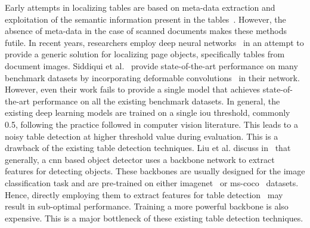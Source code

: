 \documentclass[a4paper,conference]{IEEEtran}
\begin{document}
Early attempts in localizing tables are based on meta-data extraction and exploitation of the semantic information present in the tables~\cite{Itonori1993TableSR,Kieninger1998TableSR,Tupaj96extractingtabular}. However, the absence of meta-data in  the case of scanned documents makes these methods futile. In recent years, researchers employ deep neural networks~\cite{gilani2017table,schreiber2017deepdesrt,siddiqui2018decnt,sun2019faster,vo2018ensemble,arif2018table,li2019tablebank,younas2019ffd,zhong2019publaynet,saha2019graphical,casado2019benefits} in an attempt to provide a  generic solution for localizing page objects, specifically tables from document images. Siddiqui et al.~\cite{siddiqui2018decnt} provide state-of-the-art performance on  many benchmark datasets by incorporating deformable convolutions~\cite{dai2017deformable} in their network. However, even their work fails to provide a single model that achieves state-of-the-art performance on all the existing benchmark datasets. In general, the existing deep learning models are trained on a single {\sc i}o{\sc u} threshold, commonly 0.5, following the practice followed in computer vision literature.  This leads to a noisy table detection at higher threshold value during evaluation. This is a drawback of the existing table detection techniques. Liu et al. discuss in~\cite{liu2019cbnet} that generally, a {\sc cnn} based object detector uses a backbone network to extract features for detecting objects. These backbones are usually designed for the image classification task and  are pre-trained on either {\sc i}mage{\sc n}et~\cite{deng2009imagenet} or {\sc ms-coco}~\cite{lin2014microsoft} datasets. Hence, directly employing them to extract features for table detection~\cite{gilani2017table,schreiber2017deepdesrt,siddiqui2018decnt,sun2019faster,vo2018ensemble,arif2018table,li2019tablebank,younas2019ffd,zhong2019publaynet,saha2019graphical,casado2019benefits} may result in sub-optimal performance. Training a more powerful backbone is also expensive. This is a major bottleneck of these existing table detection techniques.         
 
\end{document}
